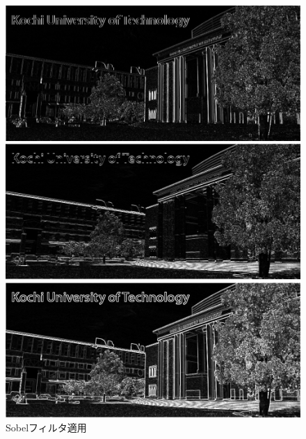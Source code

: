 \begin{figure}[H]
    \centering
    \begin{minipage}[b]{.3\textwidth}
        \centering
        \includegraphics[keepaspectratio,width=\textwidth]{../../Figures/06_31_diff-x-img.png}
    \end{minipage}
    \begin{minipage}[b]{.3\textwidth}
        \centering
        \includegraphics[keepaspectratio,width=\textwidth]{../../Figures/06_32_diff-y-img.png}
    \end{minipage}
    \begin{minipage}[b]{.3\textwidth}
        \centering
        \includegraphics[keepaspectratio,width=\textwidth]{../../Figures/06_33_diff-img.png}
    \end{minipage}
    \caption{Sobelフィルタ適用}
\end{figure}
